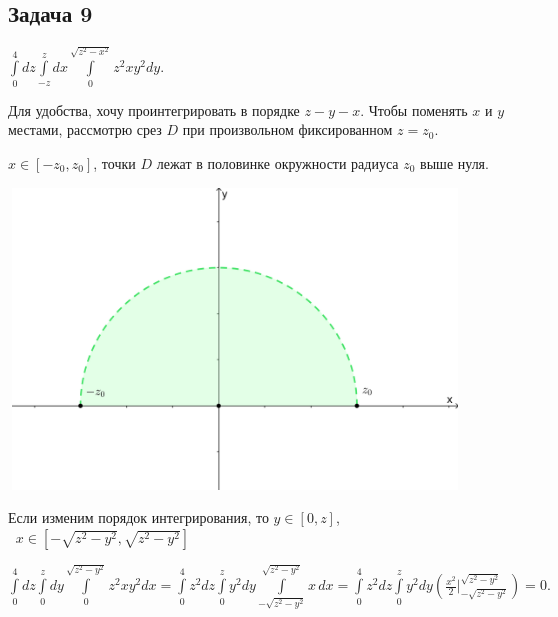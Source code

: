 \documentclass[a4paper, fleqn]{article}
\begin{document}
    \subsection*{Задача 9}    
    $\displaystyle \int\limits_{0}^{4} dz \int \limits_{-z}^{z} dx \int \limits_{0}^{\sqrt{z^2 - x^2}} z^2 x y^2 dy.$
    
    Для удобства, хочу проинтегрировать в порядке $z-y-x.$ Чтобы поменять $x$ и $y$ местами, рассмотрю срез $D$ при произвольном фиксированном $z = z_0.$
    
    $x \in [-z_0, z_0]$, точки $D$ лежат в половинке окружности радиуса $z_0$ выше нуля.
    
    \includegraphics[width=12cm, height=8cm]{list24imgs/task 2.4.9.png}
    
    Если изменим порядок интегрирования, то $y \in [0, z]$, $\; \; x \in \left[-\sqrt{z^2 - y^2}, \sqrt{z^2 - y^2}\right]$
    
    $\displaystyle \int\limits_{0}^{4} dz \int \limits_{0}^{z} dy \int \limits_{0}^{\sqrt{z^2 - y^2}} z^2 x y^2 dx = \displaystyle \int\limits_{0}^{4} z^2  dz \int \limits_{0}^{z} y^2  dy \int \limits_{-\sqrt{z^2 - y^2}}^{\sqrt{z^2 - y^2}} x \, dx = \int\limits_{0}^{4} z^2  dz \int \limits_{0}^{z} y^2  dy \left( \frac{x^2}{2} \Bigg|_{-\sqrt{z^2 - y^2}}^{\sqrt{z^2 - y^2}} \right) = 0.$
    
    
\end{document}
